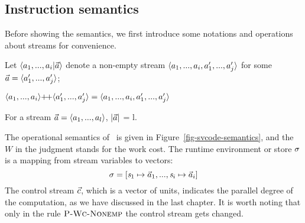 \subsection{Instruction semantics}

Before showing the semantics, we first introduce some notations and operations about streams for convenience.
\begin{nota} 
	Let $\< a_1,...,a_i | \a \'>$ denote a non-empty stream $\< a_1,...,a_i, a_1',..., a_j' \'>$ for some $\a = \< a'_1,...,a'_j \'>$;
\end{nota}


\begin{nota}
	$\vapp{\vrange{a_1}{a_i}} {\vrange{a_1'}{a_j'}} = \langle a_1,...,a_i,a_1',...,a_j' \rangle $ \\
\end{nota}

\begin{nota}
	For a stream $\a = \< a_1,...,a_l \'>$, $|\vec a|$ = l. \\
\end{nota}

The operational semantics of \fmsvcode \  is given in Figure~\ref{fig-svcode-semantics}, and the $W$ in the judgment stands for the work cost.
The runtime environment or store $\sigma$ is a mapping from stream variables to vectors:
$$\sgm = [\s_1 \|-> {\a_1},...,\s_i \|-> {\a_i}]$$
The control stream $\vec c$, which is a vector of units, indicates the parallel degree of the computation, as we have discussed in the last chapter. 
It is worth noting that only in the rule $\textsc{P-Wc-Nonemp}$ the control stream gets changed.


